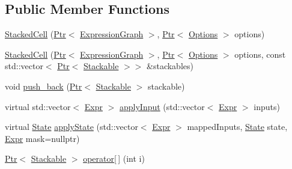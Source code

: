 \subsection*{Public Member Functions}
\begin{DoxyCompactItemize}
\item 
\hyperlink{classmarian_1_1rnn_1_1StackedCell_a97c4228ddb80424626d9ee63e5b10532}{Stacked\+Cell} (\hyperlink{namespacemarian_ad1a373be43a00ef9ce35666145137b08}{Ptr}$<$ \hyperlink{classmarian_1_1ExpressionGraph}{Expression\+Graph} $>$, \hyperlink{namespacemarian_ad1a373be43a00ef9ce35666145137b08}{Ptr}$<$ \hyperlink{classmarian_1_1Options}{Options} $>$ options)
\item 
\hyperlink{classmarian_1_1rnn_1_1StackedCell_a1e4efaf97b244cc8833a5e6a30217453}{Stacked\+Cell} (\hyperlink{namespacemarian_ad1a373be43a00ef9ce35666145137b08}{Ptr}$<$ \hyperlink{classmarian_1_1ExpressionGraph}{Expression\+Graph} $>$, \hyperlink{namespacemarian_ad1a373be43a00ef9ce35666145137b08}{Ptr}$<$ \hyperlink{classmarian_1_1Options}{Options} $>$ options, const std\+::vector$<$ \hyperlink{namespacemarian_ad1a373be43a00ef9ce35666145137b08}{Ptr}$<$ \hyperlink{classmarian_1_1rnn_1_1Stackable}{Stackable} $>$$>$ \&stackables)
\item 
void \hyperlink{classmarian_1_1rnn_1_1StackedCell_a8795edc5c74994d2587900cb2a173269}{push\+\_\+back} (\hyperlink{namespacemarian_ad1a373be43a00ef9ce35666145137b08}{Ptr}$<$ \hyperlink{classmarian_1_1rnn_1_1Stackable}{Stackable} $>$ stackable)
\item 
virtual std\+::vector$<$ \hyperlink{namespacemarian_a498d8baf75b754011078b890b39c8e12}{Expr} $>$ \hyperlink{classmarian_1_1rnn_1_1StackedCell_ae4448d097ccf117bf9385e074ccb346a}{apply\+Input} (std\+::vector$<$ \hyperlink{namespacemarian_a498d8baf75b754011078b890b39c8e12}{Expr} $>$ inputs)
\item 
virtual \hyperlink{structmarian_1_1rnn_1_1State}{State} \hyperlink{classmarian_1_1rnn_1_1StackedCell_a21feb9e10b75dca081f701343a0f35ac}{apply\+State} (std\+::vector$<$ \hyperlink{namespacemarian_a498d8baf75b754011078b890b39c8e12}{Expr} $>$ mapped\+Inputs, \hyperlink{structmarian_1_1rnn_1_1State}{State} state, \hyperlink{namespacemarian_a498d8baf75b754011078b890b39c8e12}{Expr} mask=nullptr)
\item 
\hyperlink{namespacemarian_ad1a373be43a00ef9ce35666145137b08}{Ptr}$<$ \hyperlink{classmarian_1_1rnn_1_1Stackable}{Stackable} $>$ \hyperlink{classmarian_1_1rnn_1_1StackedCell_a6c052aa3a8bdfe928c42468b130fca60}{operator\mbox{[}$\,$\mbox{]}} (int i)
$$
\end{DoxyCompactItemize}
